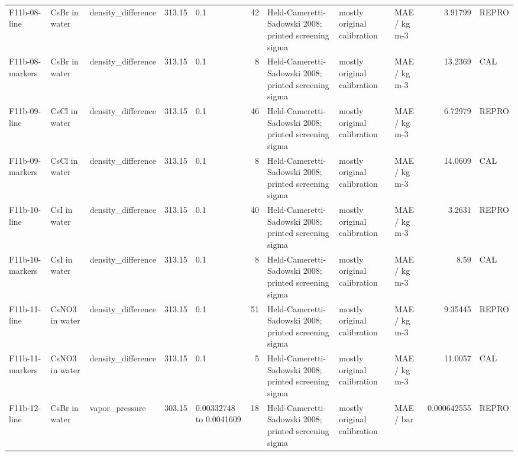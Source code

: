 \begin{landscape}
\begin{longtable}{L{1.9cm}L{2.5cm}L{2.1cm}L{1.6cm}L{1.6cm}rL{2.4cm}L{1.9cm}L{2.2cm}rL{1cm}}
F11b-\allowbreak{}08-\allowbreak{}line & CsBr in water & density\_\allowbreak{}difference & 313.15 & 0.1 & 42 & Held-\allowbreak{}Cameretti-\allowbreak{}Sadowski 2008; printed screening sigma & mostly original calibration & MAE /\allowbreak{} kg m-\allowbreak{}3 & 3.91799 & REPRO \\
F11b-\allowbreak{}08-\allowbreak{}markers & CsBr in water & density\_\allowbreak{}difference & 313.15 & 0.1 & 8 & Held-\allowbreak{}Cameretti-\allowbreak{}Sadowski 2008; printed screening sigma & mostly original calibration & MAE /\allowbreak{} kg m-\allowbreak{}3 & 13.2369 & CAL \\
F11b-\allowbreak{}09-\allowbreak{}line & CsCl in water & density\_\allowbreak{}difference & 313.15 & 0.1 & 46 & Held-\allowbreak{}Cameretti-\allowbreak{}Sadowski 2008; printed screening sigma & mostly original calibration & MAE /\allowbreak{} kg m-\allowbreak{}3 & 6.72979 & REPRO \\
F11b-\allowbreak{}09-\allowbreak{}markers & CsCl in water & density\_\allowbreak{}difference & 313.15 & 0.1 & 8 & Held-\allowbreak{}Cameretti-\allowbreak{}Sadowski 2008; printed screening sigma & mostly original calibration & MAE /\allowbreak{} kg m-\allowbreak{}3 & 14.0609 & CAL \\
F11b-\allowbreak{}10-\allowbreak{}line & CsI in water & density\_\allowbreak{}difference & 313.15 & 0.1 & 40 & Held-\allowbreak{}Cameretti-\allowbreak{}Sadowski 2008; printed screening sigma & mostly original calibration & MAE /\allowbreak{} kg m-\allowbreak{}3 & 3.2631 & REPRO \\
F11b-\allowbreak{}10-\allowbreak{}markers & CsI in water & density\_\allowbreak{}difference & 313.15 & 0.1 & 8 & Held-\allowbreak{}Cameretti-\allowbreak{}Sadowski 2008; printed screening sigma & mostly original calibration & MAE /\allowbreak{} kg m-\allowbreak{}3 & 8.59 & CAL \\
F11b-\allowbreak{}11-\allowbreak{}line & CsNO3 in water & density\_\allowbreak{}difference & 313.15 & 0.1 & 51 & Held-\allowbreak{}Cameretti-\allowbreak{}Sadowski 2008; printed screening sigma & mostly original calibration & MAE /\allowbreak{} kg m-\allowbreak{}3 & 9.35445 & REPRO \\
F11b-\allowbreak{}11-\allowbreak{}markers & CsNO3 in water & density\_\allowbreak{}difference & 313.15 & 0.1 & 5 & Held-\allowbreak{}Cameretti-\allowbreak{}Sadowski 2008; printed screening sigma & mostly original calibration & MAE /\allowbreak{} kg m-\allowbreak{}3 & 11.0057 & CAL \\
F11b-\allowbreak{}12-\allowbreak{}line & CsBr in water & vapor\_\allowbreak{}pressure & 303.15 & 0.00332748 to 0.0041609 & 18 & Held-\allowbreak{}Cameretti-\allowbreak{}Sadowski 2008; printed screening sigma & mostly original calibration & MAE /\allowbreak{} bar & 0.000642555 & REPRO \\

\end{longtable}
\end{landscape}
